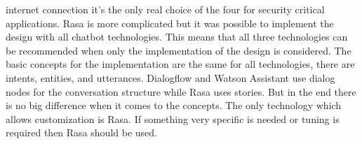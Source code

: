 internet connection it's the only real choice of the four for security critical applications.
Rasa is more complicated but it was possible to implement the design with all chatbot technologies.
This means that all three technologies can be recommended when only the implementation of the design
is considered.
The basic concepts for the implementation are the same for all technologies, there are intents,
entities, and utterances.
Dialogflow and Watson Assistant use dialog nodes for the conversation structure while Rasa 
uses stories. 
But in the end there is no big difference when it comes to the concepts.
The only technology which allows customization is Rasa.
If something very specific is needed or tuning is required then Rasa should be used.

